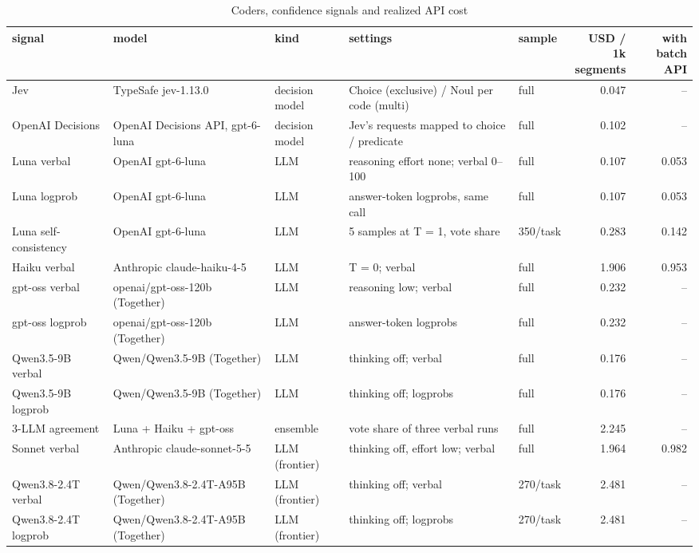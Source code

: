 \begin{table}[t]
\centering
\small
\caption{Coders, confidence signals and realized API cost}
\label{tab:tab02_coders}
\begin{adjustbox}{max width=\linewidth}
\begin{tabular}{lllllrr}
\toprule
signal & model & kind & settings & sample & \makecell[br]{USD / 1k \\{} segments} & \makecell[br]{with batch \\{} API} \\
\midrule
Jev & TypeSafe jev-1.13.0 & decision model & Choice (exclusive) / Noul per code (multi) & full & 0.047 & -- \\
OpenAI Decisions & OpenAI Decisions API, gpt-6-luna & decision model & Jev's requests mapped to choice / predicate & full & 0.102 & -- \\
Luna verbal & OpenAI gpt-6-luna & LLM & reasoning effort none; verbal 0--100 & full & 0.107 & 0.053 \\
Luna logprob & OpenAI gpt-6-luna & LLM & answer-token logprobs, same call & full & 0.107 & 0.053 \\
Luna self-consistency & OpenAI gpt-6-luna & LLM & 5 samples at T = 1, vote share & 350/task & 0.283 & 0.142 \\
Haiku verbal & Anthropic claude-haiku-4-5 & LLM & T = 0; verbal & full & 1.906 & 0.953 \\
gpt-oss verbal & openai/gpt-oss-120b (Together) & LLM & reasoning low; verbal & full & 0.232 & -- \\
gpt-oss logprob & openai/gpt-oss-120b (Together) & LLM & answer-token logprobs & full & 0.232 & -- \\
Qwen3.5-9B verbal & Qwen/Qwen3.5-9B (Together) & LLM & thinking off; verbal & full & 0.176 & -- \\
Qwen3.5-9B logprob & Qwen/Qwen3.5-9B (Together) & LLM & thinking off; logprobs & full & 0.176 & -- \\
3-LLM agreement & Luna + Haiku + gpt-oss & ensemble & vote share of three verbal runs & full & 2.245 & -- \\
Sonnet verbal & Anthropic claude-sonnet-5-5 & LLM (frontier) & thinking off, effort low; verbal & full & 1.964 & 0.982 \\
Qwen3.8-2.4T verbal & Qwen/Qwen3.8-2.4T-A95B (Together) & LLM (frontier) & thinking off; verbal & 270/task & 2.481 & -- \\
Qwen3.8-2.4T logprob & Qwen/Qwen3.8-2.4T-A95B (Together) & LLM (frontier) & thinking off; logprobs & 270/task & 2.481 & -- \\

\end{tabular}
\end{adjustbox}
\end{table}

